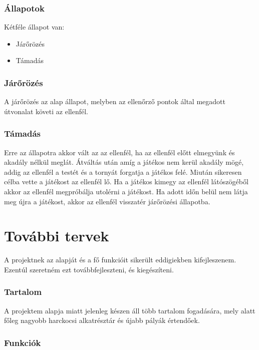 \documentclass[
]{thesis-ekf}
\theoremstyle{definition}
\theoremstyle{remark}
\begin{document}
\subsubsection{Állapotok}

Kétféle állapot van:
\begin{itemize}
 \item Járőrözés
 \item Támadás
\end{itemize}

\subsubsection{Járőrözés}

A járőrözés az alap állapot, melyben az ellenőrző pontok által megadott útvonalat követi az ellenfél.

\subsubsection{Támadás}

Erre az állapotra akkor vált az az ellenfél, ha az ellenfél előtt elmegyünk és akadály nélkül meglát. Átváltás után amíg a játékos nem kerül akadály mögé, addig az ellenfél a testét és a tornyát forgatja a játékos felé. Miután sikeresen célba vette a játékost az ellenfél lő. Ha a játékos kimegy az ellenfél látószögéből akkor az ellenfél megpróbálja utolérni a játékost. Ha adott időn belül nem látja meg újra a játékost, akkor az ellenfél visszatér járőrözési állapotba.



\section{További tervek}

A projektnek az alapját és a fő funkcióit sikerült eddigiekben kifejleszenem. Ezentúl szeretném ezt továbbfejleszteni, és kiegészíteni.

\subsubsection{Tartalom}

A projektem alapja miatt jelenleg készen áll több tartalom fogadására, mely alatt főleg nagyobb harckocsi alkatrésztár és újabb pályák értendőek.

\subsubsection{Funkciók}
\end{document}
